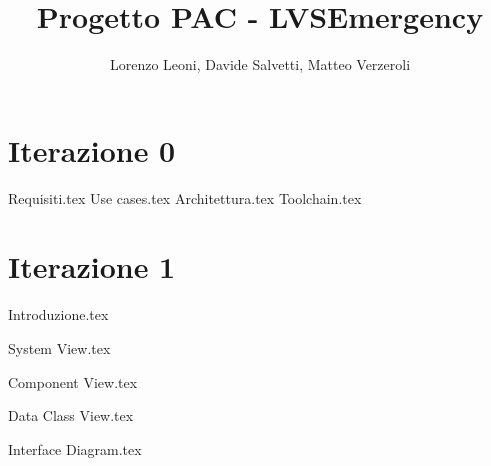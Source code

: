 \documentclass{report}
\title{Progetto PAC - LVSEmergency}
\author{Lorenzo Leoni, Davide Salvetti, Matteo Verzeroli}
\begin{document}
		
		\begin{frontespizio}
		\Margini{3cm}{3cm}{3cm}{3cm}
		\Punteggiatura{}
		\begin{Preambolo*}
			\usepackage[italian]{babel}
			\usepackage[T1]{fontenc}
			\usepackage[utf8]{inputenc}
			\usepackage{microtype}
			\usepackage{lmodern}
			\graphicspath{{img/}}
			
			\renewcommand{\frontinstitutionfont}{\fontsize{14}{17}\bfseries\scshape}
			\renewcommand{\fronttitlefont}{\fontsize{17}{21}\bfseries\scshape}
			\renewcommand{\frontfootfont}{\fontsize{12}{14}\bfseries\scshape}
		\end{Preambolo*}
	\end{frontespizio}	

	\tableofcontents
	
	\chapter{Iterazione 0}

	{Requisiti.tex}
	{Use cases.tex}
	{Architettura.tex}
	\clearpage
	{Toolchain.tex}
	
	\chapter{Iterazione 1}
	
	{Introduzione.tex}
	
	{System View.tex}
	
	\clearpage
	
	{Component View.tex}
	
	\clearpage
	
	{Data Class View.tex}	
	
	\clearpage
	
	{Interface Diagram.tex}
	
\end{document}
